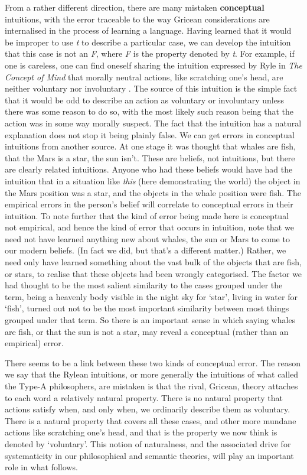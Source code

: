 From a rather different direction, there are many mistaken \textbf{conceptual} intuitions, with the error traceable to the way Gricean considerations are internalised in the process of learning a language. Having learned that it would be improper to use \textit{t} to describe a particular case, we can develop the intuition that this case is not an \textit{F}, where \textit{F} is the property denoted by \textit{t}. For example, if one is careless, one can find oneself sharing the intuition expressed by Ryle in \textit{The Concept of Mind} that morally neutral actions, like scratching one's head, are neither voluntary nor involuntary \citep{Ryle1949}. The source of this intuition is the simple fact that it would be odd to describe an action as voluntary or involuntary unless there was some reason to do so, with the most likely such reason being that the action was in some way morally suspect. The fact that the intuition has a natural explanation does not stop it being plainly false. We can get errors in conceptual intuitions from another source. At one stage it was thought that whales are fish, that the Mars is a star, the sun isn't. These are beliefs, not intuitions, but there are clearly related intuitions. Anyone who had these beliefs would have had the intuition that in a situation like \textit{this} (here demonstrating the world) the object in the Mars position was a star, and the objects in the whale position were fish. The empirical errors in the person's belief will correlate to conceptual errors in their intuition. To note further that the kind of error being made here is conceptual not empirical, and hence the kind of error that occurs in intuition, note that we need not have learned anything new about whales, the sun or Mars to come to our modern beliefs. (In fact we did, but that's a different matter.) Rather, we need only have learned something about the vast bulk of the objects that are fish, or stars, to realise that these objects had been wrongly categorised. The factor we had thought to be the most salient similarity to the cases grouped under the term, being a heavenly body visible in the night sky for `star', living in water for `fish', turned out not to be the most important similarity between most things grouped under that term. So there is an important sense in which saying whales are fish, or that the sun is not a star, may reveal a conceptual (rather than an empirical) error. 

There seems to be a link between these two kinds of conceptual error. The reason we say that the Rylean intuitions, or more generally the intuitions of what \cite[Ch. 1]{Grice1989} called the Type-A philosophers, are mistaken is that the rival, Gricean, theory attaches to each word a relatively natural property. There is no natural property that actions satisfy when, and only when, we ordinarily describe them as voluntary. There is a natural property that covers all these cases, and other more mundane actions like scratching one's head, and that is the property we now think is denoted by `voluntary'. This notion of naturalness, and the associated drive for systematicity in our philosophical and semantic theories, will play an important role in what follows.


